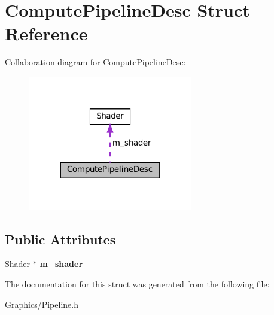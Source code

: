 \hypertarget{structComputePipelineDesc}{}\section{Compute\+Pipeline\+Desc Struct Reference}
\label{structComputePipelineDesc}


Collaboration diagram for Compute\+Pipeline\+Desc\+:\nopagebreak
\begin{figure}[H]
\begin{center}
\leavevmode
\includegraphics[width=204pt]{structComputePipelineDesc__coll__graph}
\end{center}
\end{figure}
\subsection*{Public Attributes}
\begin{DoxyCompactItemize}
\item 
\mbox{\label{structComputePipelineDesc_a54a7e5b14a70eb58b96ed98246f7d123}} 
\hyperlink{classShader}{Shader} $\ast$ {\bfseries m\+\_\+shader}
\end{DoxyCompactItemize}


The documentation for this struct was generated from the following file\+:\begin{DoxyCompactItemize}
\item 
Graphics/Pipeline.\+h\end{DoxyCompactItemize}
